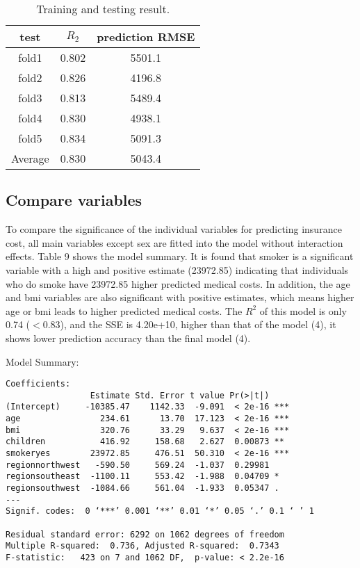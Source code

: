 \documentclass[12pt]{article}
\begin{document}
\begin{table}[ht]
\centering
\caption{ Training and testing result.\label{data3}}
\begin{tabular}{|c|c|c|}
\hline
test& $R_2$& prediction RMSE\\\hline 
fold1& 0.802& 5501.1\\\hline 
fold2& 0.826& 4196.8\\\hline 
fold3& 0.813& 5489.4\\\hline 
fold4 & 0.830& 4938.1\\\hline 
fold5& 0.834& 5091.3\\\hline 
Average& 0.830& 5043.4\\\hline 
\end{tabular}
\end{table}	

\subsection{Compare variables}
To compare the significance of the individual variables for predicting insurance cost, all main variables except sex are fitted into the model without interaction effects. Table 9 shows the model summary. It is found that smoker is a significant variable with a high and positive estimate (23972.85) indicating that individuals who do smoke have 23972.85 higher predicted medical costs. In addition, the age and bmi variables are also significant with positive estimates, which means higher age or bmi leads to higher predicted medical costs. The $R^2$ of this model is only 0.74 ($<0.83$), and the SSE is 4.20e+10, higher than that of the model (4), it shows lower prediction accuracy than the final model (4).

\medskip

Model Summary:
\begin{verbatim}
Coefficients:
                 Estimate Std. Error t value Pr(>|t|)    
(Intercept)     -10385.47    1142.33  -9.091  < 2e-16 ***
age                234.61      13.70  17.123  < 2e-16 ***
bmi                320.76      33.29   9.637  < 2e-16 ***
children           416.92     158.68   2.627  0.00873 ** 
smokeryes        23972.85     476.51  50.310  < 2e-16 ***
regionnorthwest   -590.50     569.24  -1.037  0.29981    
regionsoutheast  -1100.11     553.42  -1.988  0.04709 *  
regionsouthwest  -1084.66     561.04  -1.933  0.05347 .  
---
Signif. codes:  0 ‘***’ 0.001 ‘**’ 0.01 ‘*’ 0.05 ‘.’ 0.1 ‘ ’ 1

Residual standard error: 6292 on 1062 degrees of freedom
Multiple R-squared:  0.736,	Adjusted R-squared:  0.7343 
F-statistic:   423 on 7 and 1062 DF,  p-value: < 2.2e-16    
\end{verbatim}
			
\end{document}
